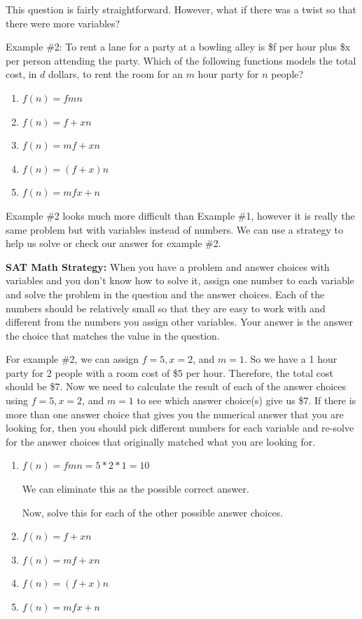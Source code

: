 This question is fairly straightforward. However, what if there was a twist so that there were more variables?

\bigskip
Example \#2: To rent a lane for a party at a bowling alley is \$f per hour plus \$x per person attending the party. Which of the following functions models the total cost, in $d$ dollars, to rent the room for an $m$ hour party for $n$ people?

\begin{enumerate}[label=(\Alph*)]
\item $f(n)=fmn$
\item $f(n)=f + xn$
\item $f(n)=mf + xn$
\item $f(n)=(f+x)n$
\item $f(n)=mfx+n$
\end{enumerate}

Example \#2 looks much more difficult than Example \#1, however it is really the same problem but with variables instead of numbers. We can use a strategy to help us solve or check our answer for example \#2.

\vfill
\textbf{SAT Math Strategy:} When you have a problem and answer choices with variables and you don't know how to solve it, assign one number to each variable and solve the problem in the question and the answer choices. Each of the numbers should be relatively small so that they are easy to work with and different from the numbers you assign other variables. Your answer is the answer the choice that matches the value in the question. 

\bigskip
For example \#2, we can assign $f=5, x=2$, and $m=1$. So we have a 1 hour party for 2 people with a room cost of \$5 per hour. Therefore, the total cost should be \$7. Now we need to calculate the result of each of the answer choices using $f=5, x=2$, and $m=1$ to see which answer choice(s) give us \$7. If there is more than one answer choice that gives you the numerical answer that you are looking for, then you should pick different numbers for each variable and re-solve for the answer choices that originally matched what you are looking for.

\begin{enumerate}[label=(\Alph*)]
\item $f(n)=fmn=5*2*1=10$

We can eliminate this as the possible correct answer.

Now, solve this for each of the other possible answer choices.

\item $f(n)=f+xn$
\item $f(n)=mf+xn$
\item $f(n)=(f+x)n$
\item $f(n)=mfx+n$
\end{enumerate}

